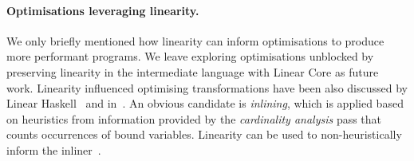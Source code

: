 \documentclass[acmsmall,review,anonymous,screen]{acmart}
\begin{document}




\paragraph{Optimisations leveraging linearity.}
We only briefly mentioned how linearity can inform optimisations to produce
more performant programs. We leave exploring optimisations unblocked by
preserving linearity in the intermediate language with Linear Core as future
work. Linearity influenced optimising transformations have been also discussed
by Linear Haskell~\cite{cite:linearhaskell} and
in~\cite{cite:let-floating,peytonjones1997a}. An obvious candidate is
\emph{inlining}, which is applied based on heuristics from information provided
by the \emph{cardinality analysis} pass that counts occurrences of bound
variables.  Linearity can be used to non-heuristically inform
the inliner~\cite{cite:linearhaskell}.
\end{document}
